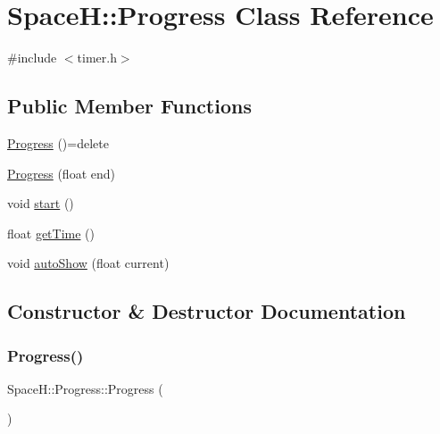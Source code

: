 \hypertarget{class_space_h_1_1_progress}{}\section{SpaceH\+:\+:Progress Class Reference}
\label{class_space_h_1_1_progress}


{\ttfamily \#include $<$timer.\+h$>$}

\subsection*{Public Member Functions}
\begin{DoxyCompactItemize}
\item 
\mbox{\hyperlink{class_space_h_1_1_progress_a7e8c56bf2ed55433c1e39b6935820e51}{Progress}} ()=delete
\item 
\mbox{\hyperlink{class_space_h_1_1_progress_af0c17e2de023eee46e2ae5d09cae6b08}{Progress}} (float end)
\item 
void \mbox{\hyperlink{class_space_h_1_1_progress_ad8537bcca9928ac45c2ce4f89645e681}{start}} ()
\item 
float \mbox{\hyperlink{class_space_h_1_1_progress_a65de623956f06ddf7b587dd248916dff}{get\+Time}} ()
\item 
void \mbox{\hyperlink{class_space_h_1_1_progress_ad194086720a65396b774f1609917ef93}{auto\+Show}} (float current)
\end{DoxyCompactItemize}


\subsection{Constructor \& Destructor Documentation}
\mbox{\label{class_space_h_1_1_progress_a7e8c56bf2ed55433c1e39b6935820e51}} 
\subsubsection{\texorpdfstring{Progress()}{Progress()}\hspace{0.1cm}{\footnotesize\ttfamily [1/2]}}
{\footnotesize\ttfamily Space\+H\+::\+Progress\+::\+Progress (\begin{DoxyParamCaption}{ }\end{DoxyParamCaption})\hspace{0.3cm}{\ttfamily [delete]}}

